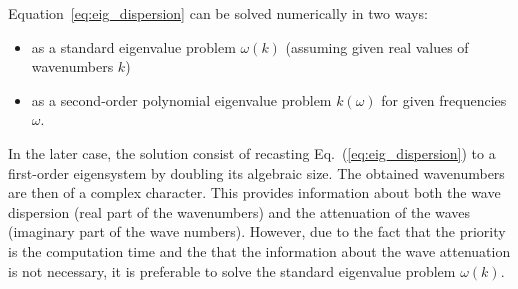 \documentclass[preprint,12pt]{elsarticle}
\begin{document}
	Equation~\ref{eq:eig_dispersion} can be solved numerically in two ways:
	\begin{itemize}
		\item as a standard eigenvalue problem $\omega (k)$ (assuming given real values of wavenumbers $k$)
		\item as a second-order polynomial eigenvalue problem $k(\omega)$ for given frequencies $\omega$.
	\end{itemize}
In the later case, the solution consist of recasting Eq.~(\ref{eq:eig_dispersion}) to a first-order eigensystem by doubling its algebraic size.  The obtained wavenumbers are then of a complex character. This provides information about both the wave dispersion (real part of the wavenumbers) and the attenuation of the waves (imaginary part of the wave numbers).  However, due to the fact that the priority is the computation time and the that the information about the wave attenuation is not necessary, it is preferable to solve the standard eigenvalue problem $\omega (k)$.
\end{document}
